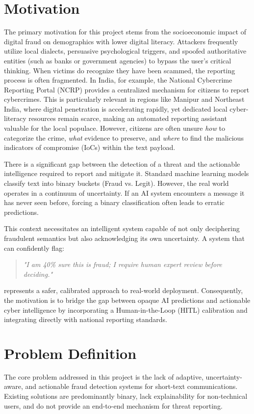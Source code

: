 \section{Motivation}
The primary motivation for this project stems from the socioeconomic impact of digital fraud on demographics with lower digital literacy. Attackers frequently utilize local dialects, persuasive psychological triggers, and spoofed authoritative entities (such as banks or government agencies) to bypass the user's critical thinking. When victims do recognize they have been scammed, the reporting process is often fragmented. In India, for example, the National Cybercrime Reporting Portal (NCRP) provides a centralized mechanism for citizens to report cybercrimes. This is particularly relevant in regions like Manipur and Northeast India, where digital penetration is accelerating rapidly, yet dedicated local cyber-literacy resources remain scarce, making an automated reporting assistant valuable for the local populace. However, citizens are often unsure \textit{how} to categorize the crime, \textit{what} evidence to preserve, and \textit{where} to find the malicious indicators of compromise (IoCs) within the text payload.

There is a significant gap between the detection of a threat and the actionable intelligence required to report and mitigate it. Standard machine learning models classify text into binary buckets (Fraud vs. Legit). However, the real world operates in a continuum of uncertainty. If an AI system encounters a message it has never seen before, forcing a binary classification often leads to erratic predictions. 

This context necessitates an intelligent system capable of not only deciphering fraudulent semantics but also acknowledging its own uncertainty. A system that can confidently flag:

\begin{quote}
    \textit{"I am 40\% sure this is fraud; I require human expert review before deciding."}
\end{quote}

represents a safer, calibrated approach to real-world deployment. Consequently, the motivation is to bridge the gap between opaque AI predictions and actionable cyber intelligence by incorporating a Human-in-the-Loop (HITL) calibration and integrating directly with national reporting standards.

\section{Problem Definition}
The core problem addressed in this project is the lack of adaptive, uncertainty-aware, and actionable fraud detection systems for short-text communications. Existing solutions are predominantly binary, lack explainability for non-technical users, and do not provide an end-to-end mechanism for threat reporting.

